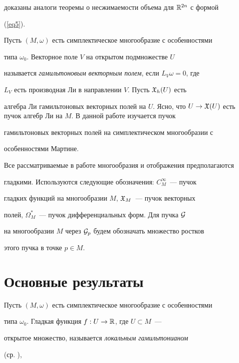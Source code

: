 доказаны аналоги теоремы о несжимаемости объема для ${\Bbb R}^{2n}$ с формой


(\ref{eq5}).





Пусть $(M,\omega)$ есть симплектическое многообразие с особенностями


типа $\omega_0$. Векторное поле $V$ на открытом подмножестве $U$


называется {\em гамильтоновым векторным полем}, если $L_V \omega =0$, где


$L_V$ есть производная Ли в направлении $V$. Пусть ${\frak X}_h(U)$ есть


алгебра Ли гамильтоновых векторных полей на $U$. Ясно, что $U \to


\gX(U)$ есть пучок алгебр Ли на $M$. В данной работе изучается пучок


гамильтоновых векторных полей на симплектическом многообразии с


особенностями Мартине.





Все рассматриваемые в работе многообразия и отображения предполагаются


гладкими. Используются следующие обозначения: $C^\infty_M$~--- пучок


гладких функций на многообразии $M$, ${\frak X}_M$~--- пучок векторных


полей, $\Omega^*_M$~--- пучок дифференциальных форм. Для пучка ${\cal G}$


на многообразии $M$ через ${\cal G}_p$ будем обозначать множество ростков


этого пучка в точке $p \in M$.








\section{Основные результаты}





Пусть $(M,\omega)$ есть симплектическое многообразие с особенностями


типа $\omega_0$. Гладкая функция $f : U \to {\Bbb R}$, где $U \subset M$~---


открытое множество, называется {\em локальным гамильтонианом}


(ср. \cite{Fom}),


